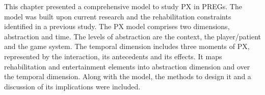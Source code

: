 This chapter presented a comprehensive model to study \ac{PX} in \acp{PREG}. The model was built upon current research and the rehabilitation constraints identified in a previous study. The \ac{PX} model comprises two dimensions, abstraction and time. The levels of abstraction are the context, the player/patient and the game system. The temporal dimension includes three moments of \ac{PX}, represented by the interaction, its antecedents and its effects. It maps rehabilitation and entertainment elements into abstraction dimension and over the temporal dimension. Along with the model, the methods to design it and a discussion of its implications were included.